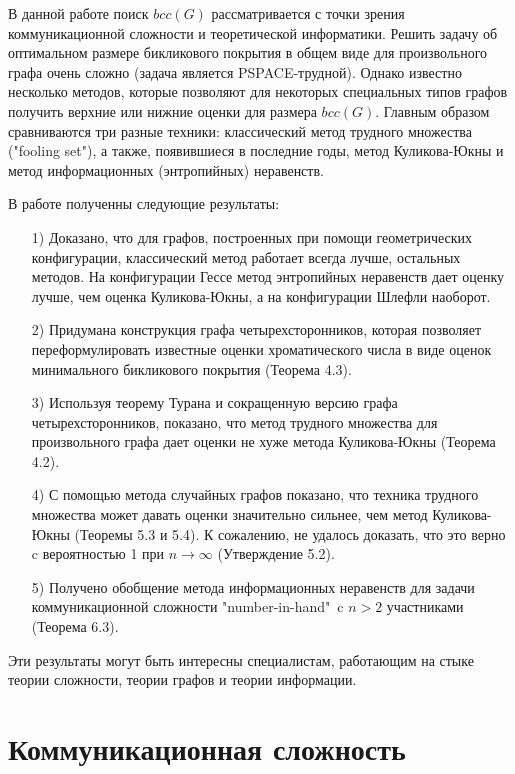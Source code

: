 \documentclass[a4paper]{article}
\begin{document}
В данной работе поиск $bcc(G)$ рассматривается с точки зрения коммуникационной сложности и 
теоретической информатики. Решить задачу об оптимальном размере бикликового покрытия в общем виде 
для произвольного графа очень сложно (задача является PSPACE-трудной). Однако известно несколько методов, 
которые позволяют для некоторых специальных типов графов получить верхние или нижние оценки для размера $bcc(G)$.
Главным образом сравниваются три разные техники: классический метод трудного множества ("fooling set"), а также,
появившиеся в последние годы, метод Куликова-Юкны и метод информационных (энтропийных) неравенств.

В работе полученны следующие результаты:
\begin{itemize}[noitemsep]
    \item[1)] Доказано, что для графов, построенных при помощи геометрических конфигурации, классический метод 
    работает всегда лучше, остальных методов. На конфигурации Гессе метод энтропийных неравенств дает оценку лучше, 
    чем оценка Куликова-Юкны, а на конфигурации Шлефли наоборот. 
    \item[2)] Придумана конструкция графа четырехсторонников, которая позволяет переформулировать известные 
    оценки хроматического числа в виде оценок минимального бикликового покрытия (Теорема 4.3).
    \item[3)] Используя теорему Турана и сокращенную версию графа четырехсторонников, показано, что 
    метод трудного множества для произвольного графа дает оценки не хуже метода Куликова-Юкны (Теорема 4.2).
    \item[4)] С помощью метода случайных графов показано, что техника трудного множества может давать 
    оценки значительно сильнее, чем метод Куликова-Юкны (Теоремы 5.3 и 5.4). К сожалению, не удалось доказать, 
    что это верно c вероятностью 1 при $n \longrightarrow \infty$ (Утверждение 5.2).
    \item[5)] Получено обобщение метода информационных неравенств для задачи коммуникационной сложности 
    "number-in-hand"\ c $n>2$ участниками (Теорема 6.3).
\end{itemize}

Эти результаты могут быть интересны специалистам, работающим на стыке теории сложности, 
теории графов и теории информации.
\newpage


\addtocounter{section}{1}
\section*{Коммуникационная сложность}
\setcounter{subsection}{0}
\end{document}

